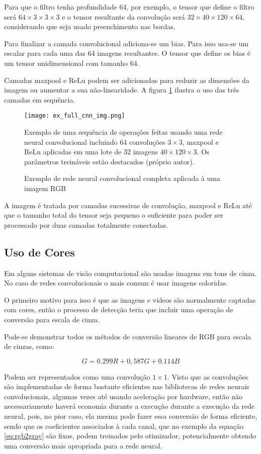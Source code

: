 Para que o filtro tenha profundidade 64, por exemplo, o tensor que define o
filtro será $64 \times 3 \times 3 \times 3$ e o tensor resultante da
convolução será $32 \times 40 \times 120 \times 64$,
considerando que seja usado preenchimento nas bordas.

Para finalizar a camada convolucional adiciona-se um bias. Para isso usa-se um
escalar para cada uma das 64 imagens resultantes. O tensor que define os bias é
um tensor unidimensional com tamanho 64.

Camadas maxpool e ReLu podem ser adicionadas para reduzir as dimensões da imagem
ou aumentar a sua não-linearidade. A figura \ref{fig:ex_full_cnn_img}
ilustra o uso das três camadas em sequência.

\begin{figure}[!htb]
	\centering
	\texttt{[image: ex\_full\_cnn\_img.png]}
	\caption{Exemplo de rede neural convolucional completa aplicada à uma imagem
	RGB}
	\label{fig:ex_full_cnn_img}
	Exemplo de uma sequência de operações feitas usando uma rede neural
	convolucional incluindo 64 convoluções $3 \times 3$, maxpool e ReLu
	aplicadas em uma
	lote de 32 imagens $40 \times 120 \times 3$. Os parâmetros treináveis
	estão destacados (próprio autor).
\end{figure}

A imagem é tratada por camadas sucessivas de convolução, maxpool e ReLu até que
o tamanho total do tensor seja pequeno o suficiente para poder ser processado
por duas camadas totalmente conectadas. 

\subsection{Uso de Cores}
Em alguns sistemas de visão computacional são usadas imagens em
tons de cinza. No caso de redes convolucionais o mais comum é usar
imagens coloridas.

O primeiro motivo para isso é que as imagens e vídeos são normalmente
captadas com cores, então o processo de detecção teria que incluir uma operação
de conversão para escala de cinza. 

Pode-se demonstrar todos os métodos de conversão lineares de RGB para escala de
cinzas, como:

\begin{equation} \label{eq:rgb2gray}
	G=0.299R + 0,587G + 0.114B
\end{equation}

Podem ser representados como uma convolução $1 \times 1$. Visto que as
convoluções são implementadas de forma bastante eficientes nas bibliotecas
de redes neurais convolucionais, algumas vezes até usando aceleração por
hardware, então não necessariamente haverá economia durante a execução
durante a execução da rede neural, pois, no pior caso, ela mesma pode fazer
essa conversão de forma eficiente, sendo que os coeficientes associados
à cada canal, que no exemplo da equação \ref{eq:rgb2gray} são fixos, podem
treinados pelo otimizador, potencialmente obtendo uma conversão mais apropriada
para a rede neural.

